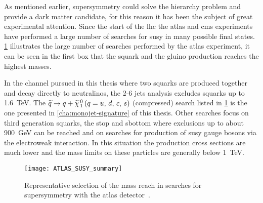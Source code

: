 As mentioned earlier, supersymmetry could solve the hierarchy problem and
provide a dark matter candidate, for this reason it has been the subject of
great experimental attention. Since the start of the \gls{lhc} the \gls{atlas}
and \gls{cms} experiments have performed a large number of searches for
\gls{susy} in many possible final states. \cref{fig:atlas_susy_summary}
illustrates the large number of searches performed by the \gls{atlas}
experiment, it can be seen in the first box that the squark and the gluino
production reaches the highest masses.

In the channel pursued in this thesis where two squarks are produced together
and decay directly to neutralinos, the 2-6 jets analysis excludes squarks up to
1.6~TeV. The $\widetilde{q} \rightarrow q + \widetilde{\chi}_{\, 1}^{\, 0}\, (q = u,\, d,\, c,\, s)$ (compressed) search listed in
\cref{fig:atlas_susy_summary} is the one presented in
\cref{cha:monojet-signature} of this thesis. Other searches focus on third
generation squarks, the stop and sbottom where exclusions up to about 900~GeV
can be reached and on searches for production of \gls{susy} gauge bosons via the
electroweak interaction. In this situation the production cross sections are
much lower and the mass limits on these particles are generally below 1~TeV.
\begin{figure}[!h]
  \centering
  \texttt{[image: ATLAS\_SUSY\_summary]}
  \caption{Representative selection of the mass reach in searches for
    supersymmetry with the \gls{atlas} detector~\cite{SUSYSummaryPlots}.}
  \label{fig:atlas_susy_summary}
\end{figure}
